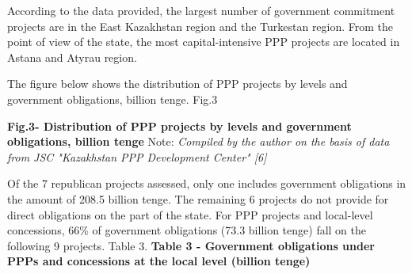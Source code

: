 
According to the data provided, the largest number of government
commitment projects are in the East Kazakhstan region and the Turkestan
region. From the point of view of the state, the most capital-intensive
PPP projects are located in Astana and Atyrau region.

The figure below shows the distribution of PPP projects by levels and
government obligations, billion tenge. Fig.3

{\bfseries Fig.3- Distribution of PPP projects by levels and government
obligations, billion tenge} Note: \emph{Compiled by the author on the
basis of data from JSC "Kazakhstan PPP Development Center" {[}6{]}}

Of the 7 republican projects assessed, only one includes government
obligations in the amount of 208.5 billion tenge. The remaining 6
projects do not provide for direct obligations on the part of the state.
For PPP projects and local-level concessions, 66\% of government
obligations (73.3 billion tenge) fall on the following 9 projects. Table
3. {\bfseries Table 3 - Government obligations under PPPs and concessions at
the local level (billion tenge)}

